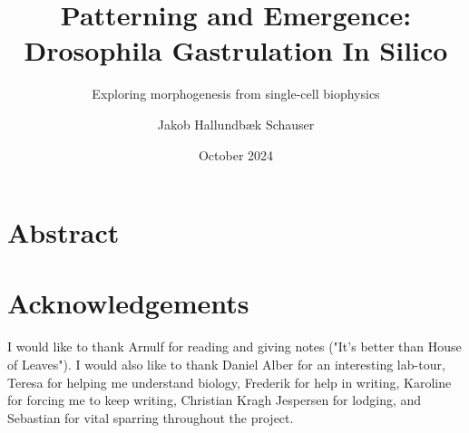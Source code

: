 \documentclass[12pt, oneside]{book}
\author{Jakob Hallundbæk Schauser}
\title{Patterning and Emergence:\\ Drosophila Gastrulation In Silico}
\subtitle{Exploring morphogenesis from single-cell biophysics}
\date{October 2024}
\begin{document}


\maketitle
\frontmatter %
\pagestyle{plain} %


\section*{Abstract}
\label{sec:abstract}



\newpage
\section*{Acknowledgements}
\label{sec:acks}
I would like to thank Arnulf for reading and giving notes ("It's better than House of Leaves"). I would also like to thank Daniel Alber for an interesting lab-tour, Teresa for helping me understand biology, Frederik for help in writing, Karoline for forcing me to keep writing, Christian Kragh Jespersen for lodging, and Sebastian for vital sparring throughout the project.\\
\end{document}
